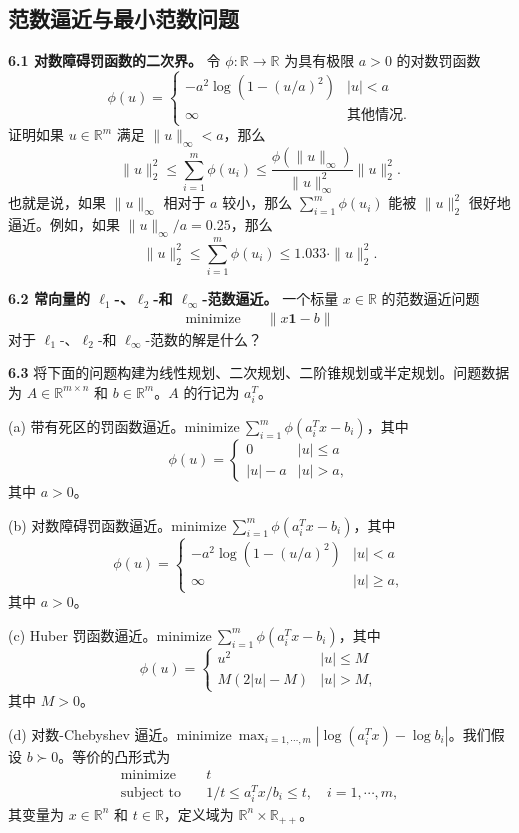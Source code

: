 \documentclass[UTF8,12pt,a4paper,fontset=fandol]{ctexart}
\begin{document}
\subsection*{范数逼近与最小范数问题}

\noindent\textbf{6.1 对数障碍罚函数的二次界。}\quad
令 $\phi:\mathbb{R}\to\mathbb{R}$ 为具有极限 $a>0$ 的对数罚函数
\[
\phi(u)=
\begin{cases}
-a^2\log(1-(u/a)^2) & |u|<a\\
\infty & \text{其他情况}.
\end{cases}
\]
证明如果 $u\in\mathbb{R}^m$ 满足 $\|u\|_\infty<a$，那么
\[
\|u\|_2^2\leq \sum_{i=1}^m\phi(u_i)\leq
\frac{\phi(\|u\|_\infty)}{\|u\|_\infty^2}\|u\|_2^2.
\]
也就是说，如果 $\|u\|_\infty$ 相对于 $a$ 较小，那么 $\sum_{i=1}^m\phi(u_i)$ 能被 $\|u\|_2^2$ 很好地逼近。例如，如果 $\|u\|_\infty/a=0.25$，那么
\[
\|u\|_2^2\leq \sum_{i=1}^m\phi(u_i)\leq 1.033\cdot \|u\|_2^2.
\]

\noindent\textbf{6.2 常向量的 $\ell_1$-、$\ell_2$-和 $\ell_\infty$-范数逼近。}\quad
一个标量 $x\in\mathbb{R}$ 的范数逼近问题
\[
\begin{aligned}
\text{minimize}\quad & \|x\mathbf{1}-b\|
\end{aligned}
\]
对于 $\ell_1$-、$\ell_2$-和 $\ell_\infty$-范数的解是什么？

\noindent\textbf{6.3}\quad
将下面的问题构建为线性规划、二次规划、二阶锥规划或半定规划。问题数据为 $A\in\mathbb{R}^{m\times n}$ 和 $b\in\mathbb{R}^m$。$A$ 的行记为 $a_i^T$。

(a) 带有死区的罚函数逼近。$\text{minimize}\ \sum_{i=1}^m\phi(a_i^Tx-b_i)$，其中
\[
\phi(u)=
\begin{cases}
0 & |u|\leq a\\
|u|-a & |u|>a,
\end{cases}
\]
其中 $a>0$。

(b) 对数障碍罚函数逼近。$\text{minimize}\ \sum_{i=1}^m\phi(a_i^Tx-b_i)$，其中
\[
\phi(u)=
\begin{cases}
-a^2\log(1-(u/a)^2) & |u|<a\\
\infty & |u|\geq a,
\end{cases}
\]
其中 $a>0$。

(c) Huber 罚函数逼近。$\text{minimize}\ \sum_{i=1}^m\phi(a_i^Tx-b_i)$，其中
\[
\phi(u)=
\begin{cases}
u^2 & |u|\leq M\\
M(2|u|-M) & |u|>M,
\end{cases}
\]
其中 $M>0$。

(d) 对数-Chebyshev 逼近。$\text{minimize}\ \max_{i=1,\cdots,m}|\log(a_i^Tx)-\log b_i|$。我们假设 $b\succ 0$。等价的凸形式为
\[
\begin{aligned}
\text{minimize}\quad & t\\
\text{subject to}\quad & 1/t\leq a_i^Tx/b_i\leq t,\quad i=1,\cdots,m,
\end{aligned}
\]
其变量为 $x\in\mathbb{R}^n$ 和 $t\in\mathbb{R}$，定义域为 $\mathbb{R}^n\times\mathbb{R}_{++}$。
\end{document}
